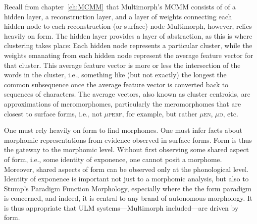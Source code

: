 Recall from chapter~\ref{ch:MCMM} that Multimorph's \ac{MCMM} consists of
of a hidden layer, a reconstruction layer, and a layer of
weights connecting each hidden node to each reconstruction (or surface) node
Multimorph, however, relies heavily on form. The hidden 
layer provides a layer of abstraction, as this is where 
clustering takes place: Each hidden node represents 
a particular cluster, while the weights emanating from
each hidden node represent the average feature vector for that
cluster. This average feature vector is more or less the intersection
of the words in the cluster, i.e., something like (but not exactly) 
the longest the common subsequence once the average feature vector
is converted back to sequences of characters. The average vectors, also known as
cluster centroids, are approximations of meromorphomes, 
particularly the meromorphomes
that are closest to surface forms, i.e., not $\mu${\textsc{perf}}, 
for example, but rather $\mu${\textsc{en}},
$\mu${\textsc{d}}, etc.


One must rely heavily on form to find morphomes. One 
must infer facts about morphomic representations
from evidence observed in surface forms. Form is thus the 
gateway to the morphomic level. Without first observing 
some shared aspect of form, i.e., some identity of exponence, 
one cannot posit a morphome. Moreover, shared aspects of form 
can be observed only at the phonological level.
Identity of exponence is important not just to a morphomic analysis,
but also to Stump's Paradigm Function Morphology, especially where the 
the form paradigm is concerned, and indeed, it is central to any 
brand of autonomous morphology. It is thus appropriate that \ac{ULM} 
systems---Multimorph included---are driven by form.

